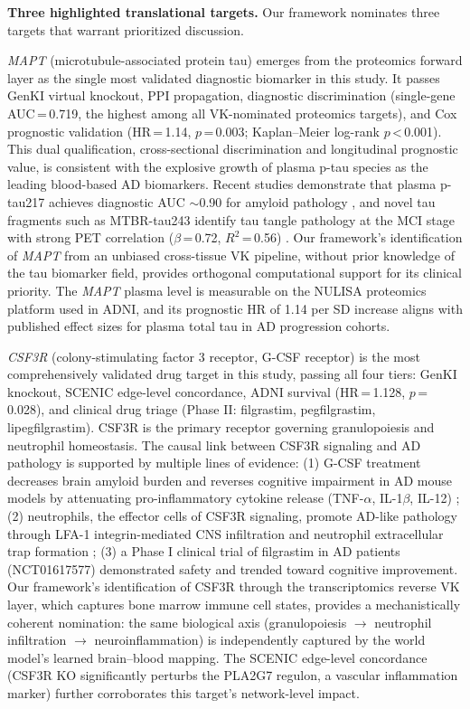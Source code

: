 \documentclass[12pt,a4paper]{article}
\begin{document}
\textbf{Three highlighted translational targets.}
Our framework nominates three targets that warrant prioritized discussion.

\textit{MAPT} (microtubule-associated protein tau) emerges from the proteomics forward layer as the single most validated diagnostic biomarker in this study. It passes GenKI virtual knockout, PPI propagation, diagnostic discrimination (single-gene AUC\,=\,0.719, the highest among all VK-nominated proteomics targets), and Cox prognostic validation (HR\,=\,1.14, $p$\,=\,0.003; Kaplan--Meier log-rank $p$\,<\,0.001). This dual qualification, cross-sectional discrimination and longitudinal prognostic value, is consistent with the explosive growth of plasma p-tau species as the leading blood-based AD biomarkers. Recent studies demonstrate that plasma p-tau217 achieves diagnostic AUC $\sim$0.90 for amyloid pathology \citep{hansson2024}, and novel tau fragments such as MTBR-tau243 identify tau tangle pathology at the MCI stage with strong PET correlation ($\beta$\,=\,0.72, $R^2$\,=\,0.56) \citep{barthelemy2025}. Our framework's identification of \textit{MAPT} from an unbiased cross-tissue VK pipeline, without prior knowledge of the tau biomarker field, provides orthogonal computational support for its clinical priority. The \textit{MAPT} plasma level is measurable on the NULISA proteomics platform used in ADNI, and its prognostic HR of 1.14 per SD increase aligns with published effect sizes for plasma total tau in AD progression cohorts.

\textit{CSF3R} (colony-stimulating factor 3 receptor, G-CSF receptor) is the most comprehensively validated drug target in this study, passing all four tiers: GenKI knockout, SCENIC edge-level concordance, ADNI survival (HR\,=\,1.128, $p$\,=\,0.028), and clinical drug triage (Phase II: filgrastim, pegfilgrastim, lipegfilgrastim). CSF3R is the primary receptor governing granulopoiesis and neutrophil homeostasis. The causal link between CSF3R signaling and AD pathology is supported by multiple lines of evidence: (1) G-CSF treatment decreases brain amyloid burden and reverses cognitive impairment in AD mouse models by attenuating pro-inflammatory cytokine release (TNF-$\alpha$, IL-1$\beta$, IL-12) \citep{tsai2007}; (2) neutrophils, the effector cells of CSF3R signaling, promote AD-like pathology through LFA-1 integrin-mediated CNS infiltration and neutrophil extracellular trap formation \citep{zenaro2015}; (3) a Phase I clinical trial of filgrastim in AD patients (NCT01617577) demonstrated safety and trended toward cognitive improvement. Our framework's identification of CSF3R through the transcriptomics reverse VK layer, which captures bone marrow immune cell states, provides a mechanistically coherent nomination: the same biological axis (granulopoiesis $\rightarrow$ neutrophil infiltration $\rightarrow$ neuroinflammation) is independently captured by the world model's learned brain--blood mapping. The SCENIC edge-level concordance (CSF3R KO significantly perturbs the PLA2G7 regulon, a vascular inflammation marker) further corroborates this target's network-level impact.
\end{document}
